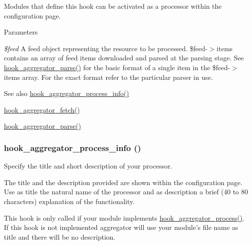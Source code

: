 Modules that define this hook can be activated as a processor within the configuration page.


\begin{DoxyParams}{Parameters}
\item[{\em \$feed}]A feed object representing the resource to be processed. \$feed-\/$>$items contains an array of feed items downloaded and parsed at the parsing stage. See \hyperlink{group__hooks_gae27163e729bb531cc527ec6f0ad16943}{hook\_\-aggregator\_\-parse()} for the basic format of a single item in the \$feed-\/$>$items array. For the exact format refer to the particular parser in use.\end{DoxyParams}
\begin{DoxySeeAlso}{See also}
\hyperlink{group__hooks_gae616ac385e5ff114031dc2dc88413e32}{hook\_\-aggregator\_\-process\_\-info()} 

\hyperlink{group__hooks_ga459db08cc062e9ea3bf1f526daf91a4a}{hook\_\-aggregator\_\-fetch()} 

\hyperlink{group__hooks_gae27163e729bb531cc527ec6f0ad16943}{hook\_\-aggregator\_\-parse()} 
\end{DoxySeeAlso}
\hypertarget{group__hooks_gae616ac385e5ff114031dc2dc88413e32}{
\subsubsection[{hook\_\-aggregator\_\-process\_\-info}]{\setlength{\rightskip}{0pt plus 5cm}hook\_\-aggregator\_\-process\_\-info ()}}
\label{group__hooks_gae616ac385e5ff114031dc2dc88413e32}
Specify the title and short description of your processor.

The title and the description provided are shown within the configuration page. Use as title the natural name of the processor and as description a brief (40 to 80 characters) explanation of the functionality.

This hook is only called if your module implements \hyperlink{group__hooks_gaf5da0f420ab3b27c1bc33f339c979ac7}{hook\_\-aggregator\_\-process()}. If this hook is not implemented aggregator will use your module's file name as title and there will be no description.

